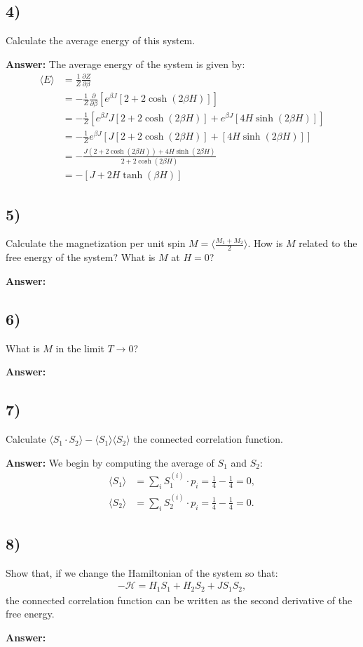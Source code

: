 \documentclass[a4paper]{article}
\newcommand{\newparagraph}{\vspace{.5cm}\noindent}
\newcommand{\average}[1]{\langle #1 \rangle}
\begin{document}
\subsection*{4)}
Calculate the average energy of this system.

\newparagraph
\textbf{Answer:} The average energy of the system is given by:
\begin{align*}
    \average{E} &= \frac{1}{Z}\frac{\partial Z}{\partial \beta}\\
    &= -\frac{1}{Z}\frac{\partial}{\partial \beta}\left[e^{\beta J}\left[2 + 2\cosh(2\beta H)\right]\right]\\
    &= -\frac{1}{Z}\left[e^{\beta J}J\left[2 + 2\cosh(2\beta H)\right] + e^{\beta J}\left[4H\sinh(2\beta H)\right]\right]\\
    &= -\frac{1}{Z}e^{\beta J}\left[J\left[2 + 2\cosh(2\beta H)\right] + \left[4H\sinh(2\beta H)\right]\right]\\
    &= -\frac{J\left(2 + 2\cosh(2\beta H)\right) + 4H\sinh(2\beta H)}{2 + 2\cosh(2\beta H)}\\
    &=  -\left[J+ 2H\tanh(\beta H)\right]
\end{align*}

\subsection*{5)}
Calculate the magnetization per unit spin $M =\langle\frac{M_1 + M_2}{2}\rangle$. How is $M$ related to the free energy of the system?
What is $M$ at $H = 0$?

\newparagraph
\textbf{Answer:}

\subsection*{6)}
What is $M$ in the limit $T\to 0$?

\newparagraph
\textbf{Answer:}

\subsection*{7)}
Calculate $\average{S_1 \cdot S_2} - \average{S_1}\average{S_2}$ the connected correlation function.

\newparagraph
\textbf{Answer:} We begin by computing the average of $S_1$ and $S_2$:
\begin{align*}
    \average{S_1} &= \sum_i S_1^{(i)} \cdot p_i = \frac{1}{4} - \frac{1}{4} = 0,\\
    \average{S_2} &= \sum_i S_2^{(i)}\cdot p_i = \frac{1}{4} - \frac{1}{4} = 0.
\end{align*}

\subsection*{8)}
Show that, if we change the Hamiltonian of the system so that:
\begin{align*}
    -\mathcal{H} = H_1S_1 + H_2S_2 + JS_1S_2,
\end{align*}the connected correlation function can be written as the second derivative of the free energy.

\newparagraph
\textbf{Answer:}
\end{document}
